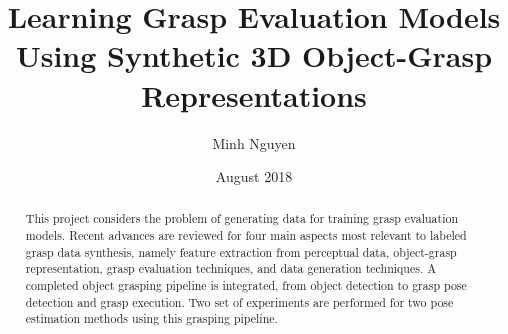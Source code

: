 \documentclass[rnd]{mas_report}
\author{Minh Nguyen}
\title{Learning Grasp Evaluation Models Using Synthetic 3D Object-Grasp Representations}
\date{August 2018}
\begin{document}
\begin{titlepage}
    \maketitle
\end{titlepage}


\pagestyle{plain}


\cleardoublepage
\statementpage

\begin{abstract}
This project considers the problem of generating data for training grasp evaluation models. Recent advances are reviewed
for four main aspects most relevant to labeled grasp data synthesis, namely feature extraction from perceptual data,
object-grasp representation, grasp evaluation techniques, and data generation techniques. A completed object grasping
pipeline is integrated, from object detection to grasp pose detection and grasp execution. Two set of experiments are
performed for two pose estimation methods using this grasping pipeline.
\end{abstract}

\tableofcontents
\listoffigures
\listoftables


\mainmatter %

\pagestyle{mainmatter}









\begin{appendices}


\end{appendices}

\backmatter



\end{document}
